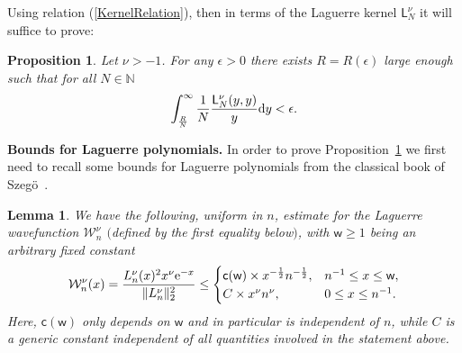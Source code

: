 \documentclass[pdftex]{sigma}
\numberwithin{equation}{section}
\newtheorem{Lemma}[Theorem]{Lemma}
\newtheorem{Proposition}[Theorem]{Proposition}
{ \theoremstyle{definition}
\newtheorem{Definition}[Theorem]{Definition}
\newtheorem{Remark}[Theorem]{Remark} }
\begin{document}
Using relation (\ref{KernelRelation}), then in terms of the Laguerre kernel $\mathsf{L}_N^{\nu}$ it will suffice to prove:

\begin{Proposition}\label{EstimateLaguerre}
Let $\nu>-1$. For any $\epsilon>0$ there exists $R=R(\epsilon)$ large enough such that for all $N \in \mathbb{N}$
\begin{gather*}
\int_{\frac{R}{N}}^{\infty}\frac{1}{N}\frac{\mathsf{L}_N^{\nu}(y,y)}{y}{\rm d}y<\epsilon.
\end{gather*}
\end{Proposition}

{\bf Bounds for Laguerre polynomials.} In order to prove Proposition~\ref{EstimateLaguerre} we first need to recall some bounds for Laguerre polynomials from the classical book of Szeg\"{o}~\cite{Szego}.

\begin{Lemma}\label{wavefunctionestimate}We have the following, uniform in $n$, estimate for the Laguerre wavefunction $\mathcal{W}_n^{\nu}$ $($defined by the first equality below$)$, with $\mathsf{w}\ge 1$ being an arbitrary fixed constant
\begin{gather*}%
\mathcal{W}_{n}^{\nu}(x)=\frac{L_n^{\nu}(x)^2x^{\nu}{\rm e}^{-x}}{\|L_n^{\nu}\|_2^2}\le \begin{cases}
\mathsf{c}(\mathsf{w})\times x^{-\frac{1}{2}}n^{-\frac{1}{2}}, & n^{-1}\le x \le \mathsf{w},\\
C\times x^\nu n^{\nu}, & 0 \le x \le n^{-1}.
\end{cases}
\end{gather*}
Here, $\mathsf{c}(\mathsf{w})$ only depends on $\mathsf{w}$ and in particular is independent of $n$, while $C$ is a generic constant independent of all quantities involved in the statement above.
\end{Lemma}
\end{document}
